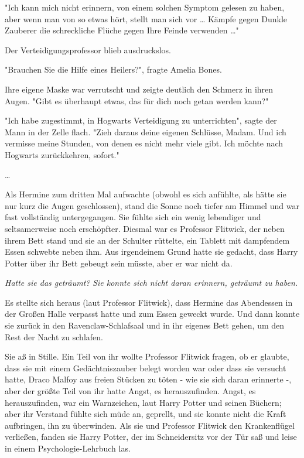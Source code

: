 {"Ich kann mich nicht erinnern, von einem solchen Symptom gelesen zu haben, aber wenn man von so etwas hört, stellt man sich vor … Kämpfe gegen Dunkle Zauberer die schreckliche Flüche gegen Ihre Feinde verwenden …"

Der Verteidigungsprofessor blieb ausdruckslos.

"Brauchen Sie die Hilfe eines Heilers?", fragte Amelia Bones.

Ihre eigene Maske war verrutscht und zeigte deutlich den Schmerz in ihren Augen. "Gibt es überhaupt etwas, das für dich noch getan werden kann?"

"Ich habe zugestimmt, in Hogwarts Verteidigung zu unterrichten", sagte der Mann in der Zelle flach. "Zieh daraus deine eigenen Schlüsse, Madam. Und ich vermisse meine Stunden, von denen es nicht mehr viele gibt. Ich möchte nach Hogwarts zurückkehren, sofort."

…

Als Hermine zum dritten Mal aufwachte (obwohl es sich anfühlte, als hätte sie nur kurz die Augen geschlossen), stand die Sonne noch tiefer am Himmel und war fast vollständig untergegangen. Sie fühlte sich ein wenig lebendiger und seltsamerweise noch erschöpfter. Diesmal war es Professor Flitwick, der neben ihrem Bett stand und sie an der Schulter rüttelte, ein Tablett mit dampfendem Essen schwebte neben ihm. Aus irgendeinem Grund hatte sie gedacht, dass Harry Potter über ihr Bett gebeugt sein müsste, aber er war nicht da.

\emph{Hatte sie das geträumt?} \emph{Sie konnte sich nicht daran erinnern, geträumt zu haben.}

Es stellte sich heraus (laut Professor Flitwick), dass Hermine das Abendessen in der Großen Halle verpasst hatte und zum Essen geweckt wurde. Und dann konnte sie zurück in den Ravenclaw-Schlafsaal und in ihr eigenes Bett gehen, um den Rest der Nacht zu schlafen.

Sie aß in Stille. Ein Teil von ihr wollte Professor Flitwick fragen, ob er glaubte, dass sie mit einem Gedächtniszauber belegt worden war oder dass sie versucht hatte, Draco Malfoy aus freien Stücken zu töten - wie sie sich daran erinnerte -, aber der größte Teil von ihr hatte Angst, es herauszufinden. Angst, es herauszufinden, war ein Warnzeichen, laut Harry Potter und seinen Büchern; aber ihr Verstand fühlte sich müde an, geprellt, und sie konnte nicht die Kraft aufbringen, ihn zu überwinden. Als sie und Professor Flitwick den Krankenflügel verließen, fanden sie Harry Potter, der im Schneidersitz vor der Tür saß und leise in einem Psychologie-Lehrbuch las.

}
